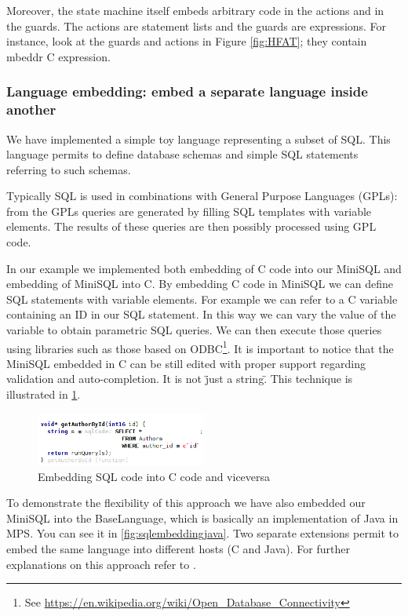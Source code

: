 \documentclass[preprint,numbers,10pt]{sigplanconf}
\begin{document}
Moreover, the state machine itself embeds arbitrary code in the actions
and in the guards. The actions are statement lists and the guards are expressions.
For instance, look at the guards and actions in Figure \ref{fig:HFAT}; they contain mbeddr C expression.

\subsubsection{Language embedding: embed a separate language inside another}
\label{evr:langembed}

We have implemented a simple toy language representing a subset of SQL. This language permits to define database schemas and simple SQL statements referring to such schemas.

Typically SQL is used in combinations with General Purpose Languages (GPLs): from the GPLs queries are generated by filling SQL templates with variable elements. The results of these queries are then possibly processed using GPL code.

In our example we implemented both embedding of C code into our MiniSQL and embedding of MiniSQL into C.
By embedding C code in MiniSQL we can define SQL statements with variable elements. For example we can refer to a C variable containing an ID in our SQL statement. In this way we can vary the value of the variable to obtain parametric SQL queries. We can then execute those queries using libraries such as those based on ODBC\footnote{See \url{https://en.wikipedia.org/wiki/Open_Database_Connectivity}}. It is important to notice that the MiniSQL embedded in C can be still edited with proper support regarding validation and auto-completion. It is not \"just a string\".
This technique is illustrated in \ref{fig:sqlembedding}.

\begin{figure}[p]
	\centering
	\includegraphics[width=0.50\textwidth]{screens/minisql_embedded.png}
	\caption{Embedding SQL code into C code and viceversa}
	\label{fig:sqlembedding}
\end{figure}

To demonstrate the flexibility of this approach we have also embedded our MiniSQL into the BaseLanguage, which is basically an implementation of Java in MPS. You can see it in \ref{fig:sqlembeddingjava}. Two separate extensions permit to embed the same language into different hosts (C and Java). For further explanations on this approach refer to \cite{Tomassetti2013}.
\end{document}
